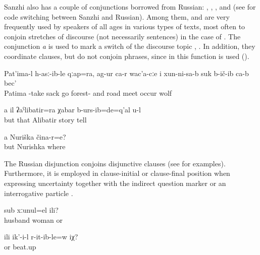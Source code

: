 Sanzhi also has a couple of conjunctions borrowed from Russian:  ,  ,  , and   (see \citet{ForkerSubmitteda} for code switching between Sanzhi and Russian). Among them,  and  are very frequently used by speakers of all ages in various types of texts, most often to conjoin stretches of discourse (not necessarily sentences) in the case of . The conjunction \textit{a} is used to mark a switch of the discourse topic ,  . In addition, they coordinate clauses, but do not conjoin phrases, since in this function  is used ().
%
\begin{exe}
	\ex	\label{ex:‎Patima took a sack and went into the forest and on the way she met a wolf minor}
	\gll	Pat'ima-l	h-asː-ib-le	qːap=ra,	ag-ur	ca-r	wac'a-cːe	i xun-ni-sa-b	suk	b-ič-ib	ca-b	bec'\\
		Patima	-take	sack	go		forest-	and	road	meet	occur		wolf\\
	\glt	{}

	\ex	\label{ex:and / but you also already told the story of Alibatir minor}
	\gll	a	il	ʡaˁlibatir=ra	χabar	b-urs-ib=de=q'al	u-l\\
		but	that	Alibatir	story	tell	\\
	\glt	{}

	\ex	\label{ex:‎And Nurishka, where is she minor}
	\gll	a	Nuriška	čina-r=e?\\
		but	Nurishka	where\\
	\glt	{}
\end{exe}

The Russian disjunction   conjoins disjunctive clauses (see  for examples). Furthermore, it is employed in clause-initial or clause-final position when expressing uncertainty together with the indirect question marker  or an interrogative particle .
%
\begin{exe}
	\ex	\label{ex:‎Or this is a married couple minor}
	\gll	sub	xːunul=el	ili?\\
		husband	woman	or\\
	\glt	{}

	\ex	\label{ex:Or did he beat her minor}
	\gll	ili	ik'-i-l	r-it-ib-le=w	iχ?\\
		or		beat.up	\\
	\glt	{}
\end{exe}

